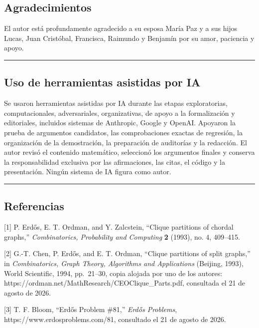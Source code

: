 \documentclass[
  spanish,
  11pt,
  a4paper,
]{article}
\begin{document}
\subsection{Agradecimientos}\label{agradecimientos}

El autor está profundamente agradecido a su esposa María Paz y a sus hijos Lucas, Juan Cristóbal, Francisca, Raimundo y Benjamín por su amor, paciencia y apoyo.

\begin{center}\rule{0.5\linewidth}{0.5pt}\end{center}

\subsection{Uso de herramientas asistidas por IA}\label{uso-de-herramientas-asistidas-por-ia}

Se usaron herramientas asistidas por IA durante las etapas exploratorias, computacionales, adversariales, organizativas, de apoyo a la formalización y editoriales, incluidos sistemas de Anthropic, Google y OpenAI. Apoyaron la prueba de argumentos candidatos, las comprobaciones exactas de regresión, la organización de la demostración, la preparación de auditorías y la redacción. El autor revisó el contenido matemático, seleccionó los argumentos finales y conserva la responsabilidad exclusiva por las afirmaciones, las citas, el código y la presentación. Ningún sistema de IA figura como autor.

\begin{center}\rule{0.5\linewidth}{0.5pt}\end{center}

\subsection{Referencias}\label{referencias}

{[}1{]} P. Erdős, E. T. Ordman, and Y. Zalcstein, ``Clique partitions of chordal graphs,'' \emph{Combinatorics, Probability and Computing} \textbf{2} (1993), no. 4, 409--415.

{[}2{]} G.-T. Chen, P. Erdős, and E. T. Ordman, ``Clique partitions of split graphs,'' in \emph{Combinatorics, Graph Theory, Algorithms and Applications} (Beijing, 1993), World Scientific, 1994, pp.~21--30, copia alojada por uno de los autores: https://ordman.net/MathResearch/CEOClique\_Parts.pdf, consultada el 21 de agosto de 2026.

{[}3{]} T. F. Bloom, ``Erdős Problem \#81,'' \emph{Erdős Problems}, https://www.erdosproblems.com/81, consultado el 21 de agosto de 2026.
\end{document}
